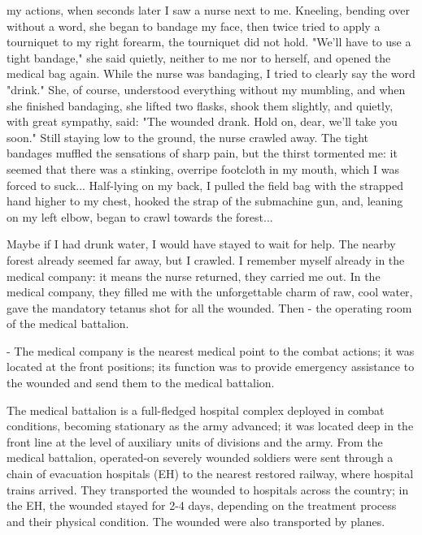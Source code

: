 \label{11-1}
my actions, when seconds later I saw a nurse next to me. Kneeling, bending over without a word, she began to bandage my face, then twice tried to apply a tourniquet to my right forearm, the tourniquet did not hold. "We'll have to use a tight bandage," she said quietly, neither to me nor to herself, and opened the medical bag again. While the nurse was bandaging, I tried to clearly say the word "drink." She, of course, understood everything without my mumbling, and when she finished bandaging, she lifted two flasks, shook them slightly, and quietly, with great sympathy, said: "The wounded drank. Hold on, dear, we'll take you soon." Still staying low to the ground, the nurse crawled away. The tight bandages muffled the sensations of sharp pain, but the thirst tormented me: it seemed that there was a stinking, overripe footcloth in my mouth, which I was forced to suck... Half-lying on my back, I pulled the field bag with the strapped hand higher to my chest, hooked the strap of the submachine gun, and, leaning on my left elbow, began to crawl towards the forest...

\label{12-1}
Maybe if I had drunk water, I would have stayed to wait for help. The nearby forest already seemed far away, but I crawled. I remember myself already in the medical company: it means the nurse returned, they carried me out. In the medical company, they filled me with the unforgettable charm of raw, cool water, gave the mandatory tetanus shot for all the wounded. Then - the operating room of the medical battalion.

\label{12-2}
- The medical company is the nearest medical point to the combat actions; it was located at the front positions; its function was to provide emergency assistance to the wounded and send them to the medical battalion.

\label{12-3}
The medical battalion is a full-fledged hospital complex deployed in combat conditions, becoming stationary as the army advanced; it was located deep in the front line at the level of auxiliary units of divisions and the army. From the medical battalion, operated-on severely wounded soldiers were sent through a chain of evacuation hospitals (EH) to the nearest restored railway, where hospital trains arrived. They transported the wounded to hospitals across the country; in the EH, the wounded stayed for 2-4 days, depending on the treatment process and their physical condition. The wounded were also transported by planes.

